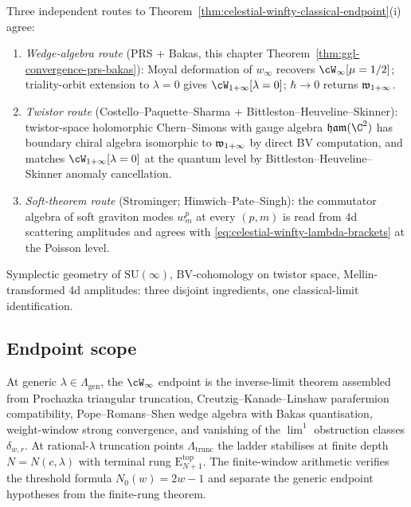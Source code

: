\begin{remark}
\label{rem:celestial-winfty-iv-triangle}
Three independent routes to
Theorem~\ref{thm:celestial-winfty-classical-endpoint}(i) agree:
\begin{enumerate}[label=\textup{(\alph*)}]
\item \emph{Wedge-algebra route} (PRS + Bakas, this chapter
Theorem~\ref{thm:ggl-convergence-prs-bakas}): Moyal deformation
of $w_\infty$ recovers $\cW_\infty[\mu=1/2]$; triality-orbit
extension to $\lambda = 0$ gives $\cW_{1+\infty}[\lambda=0]$;
$\hbar \to 0$ returns $\mathfrak{w}_{1+\infty}$.
\item \emph{Twistor route} (Costello--Paquette--Sharma +
Bittleston--Heuveline--Skinner): twistor-space holomorphic
Chern--Simons with gauge algebra $\mathfrak{ham}(\C^2)$ has
boundary chiral algebra isomorphic to $\mathfrak{w}_{1+\infty}$ by direct BV
computation, and matches $\cW_{1+\infty}[\lambda=0]$ at the
quantum level by Bittleston--Heuveline--Skinner anomaly
cancellation.
\item \emph{Soft-theorem route} (Strominger; Himwich--Pate--Singh):
the commutator algebra of soft graviton modes $w^p_m$ at every
$(p,m)$ is read from $4$d scattering amplitudes and agrees with
\eqref{eq:celestial-winfty-lambda-brackets} at the Poisson level.
\end{enumerate}
Symplectic geometry of $\mathrm{SU}(\infty)$, BV-cohomology on
twistor space, Mellin-transformed 4d amplitudes: three disjoint
ingredients, one classical-limit identification.
\end{remark}

\subsection{Endpoint scope}
\label{subsec:headline-inscription}

At generic $\lambda \in \Lambda_{\mathrm{gen}}$, the $\cW_\infty$
endpoint is the inverse-limit theorem assembled from Prochazka
triangular truncation, Creutzig--Kanade--Linshaw parafermion
compatibility, Pope--Romans--Shen wedge algebra with Bakas
quantisation, weight-window strong convergence, and vanishing of
the \(\lim^1\) obstruction classes \(\delta_{w,r}\). At
rational-$\lambda$ truncation points $\Lambda_{\mathrm{trunc}}$
the ladder stabilises at finite depth $N = N(c, \lambda)$ with
terminal rung $\mathrm{E}_{N+1}^{\mathrm{top}}$. The finite-window
arithmetic verifies the threshold formula
\(N_0(w)=2w-1\) and separate the generic endpoint hypotheses
from the finite-rung theorem.

